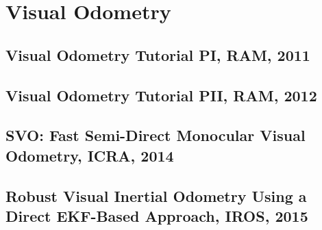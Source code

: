 
\chapter{Visual Odometry}
\label{chap:odometry}

\section{Visual Odometry Tutorial PI, RAM, 2011}


\section{Visual Odometry Tutorial PII, RAM, 2012}



\section{SVO: Fast Semi-Direct Monocular Visual Odometry, ICRA, 2014}


\section{Robust Visual Inertial Odometry Using a Direct EKF-Based Approach, IROS, 2015}

